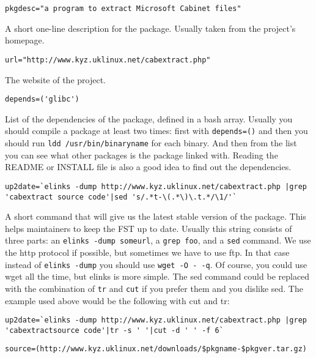 \begin{verbatim}
pkgdesc="a program to extract Microsoft Cabinet files"
\end{verbatim}

A short one-line description for the package. Usually taken from the project's homepage.

\begin{verbatim}
url="http://www.kyz.uklinux.net/cabextract.php"
\end{verbatim}

The website of the project.

\begin{verbatim}
depends=('glibc')
\end{verbatim}

List of the dependencies of the package, defined in a bash array. Usually you should compile a package at least two times: first with {\tt depends=()} and then you should run {\tt ldd /usr/bin/binaryname} for each binary. And then from the list you can see what other packages is the package linked with. Reading the README or INSTALL file is also a good idea to find out the dependencies.

\begin{verbatim}
up2date=`elinks -dump http://www.kyz.uklinux.net/cabextract.php |grep 'cabextract source code'|sed 's/.*t-\(.*\)\.t.*/\1/'`
\end{verbatim}

A short command that will give us the latest stable version of the package. This helps maintainers to keep the FST up to date. Usually this string consists of three parts: an {\tt elinks -dump someurl}, a {\tt grep foo}, and a {\tt sed} command. We use the http protocol if possible, but sometimes we have to use ftp. In that case instead of {\tt elinks -dump} you should use {\tt wget -O - -q}. Of course, you could use wget all the time, but elinks is more simple. The sed command could be replaced with the combination of {\tt tr} and {\tt cut} if you prefer them and you dislike sed. The example used above would be the following with cut and tr:

\begin{verbatim}
up2date=`elinks -dump http://www.kyz.uklinux.net/cabextract.php |grep 'cabextractsource code'|tr -s ' '|cut -d ' ' -f 6`
\end{verbatim}

\begin{verbatim}
source=(http://www.kyz.uklinux.net/downloads/$pkgname-$pkgver.tar.gz)
\end{verbatim}

